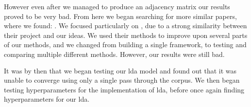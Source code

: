 However even after we managed to produce an adjacency matrix our results proved to be very bad.
From here we began searching for more similar papers, where we found: .
We focused particularly on , due to a strong similarity between their project and our ideas.
We used their methods to improve upon several parts of our methods, and we changed from building a single framework, to testing and comparing multiple different methods. 
However, our results were still bad.

It was by then that we began testing our \gls{lda} model and found out that it was unable to converge using only a single pass through the corpus. 
We then began testing hyperparameters for the implementation of \gls{lda}, before once again finding hyperparameters for our \gls{lda}.
